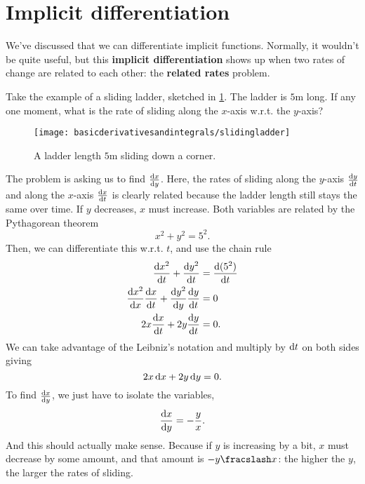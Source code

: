 \section{Implicit differentiation}

We've discussed that we can differentiate implicit functions. Normally, it wouldn't be quite useful, but this \textbf{implicit differentiation} shows up when two rates of change are related to each other: the \textbf{related rates} problem.

Take the example of a sliding ladder, sketched in \cref{fig:slidingladder}. The ladder is $5\unit{\meter}$ long. If any one moment, what is the rate of sliding along the $x$-axis w.r.t. the $y$-axis?

\begin{figure}
    \centering
    \texttt{[image: basicderivativesandintegrals/slidingladder]}
    \caption{A ladder length $5\unit{\meter}$ sliding down a corner.}
    \label{fig:slidingladder}
\end{figure}

The problem is asking us to find $\odv{x}{y}$. Here, the rates of sliding along the $y$-axis $\odv{y}{t}$ and along the $x$-axis $\odv{x}{t}$ is clearly related because the ladder length still stays the same over time. If $y$ decreases, $x$ must increase. Both variables are related by the Pythagorean theorem
\begin{equation}
    x^2 + y^2 = 5^2.
\end{equation}
Then, we can differentiate this w.r.t. $t$, and use the chain rule
\begin{align*}
    \odv{x^2}{t} + \odv{y^2}{t} &= \odv{(5^2)}{t} \\
    \odv{x^2}{x}\odv{x}{t} + \odv{y^2}{y}\odv{y}{t} &= 0 \\
    2x\odv{x}{t} + 2y\odv{y}{t} &= 0.
\end{align*}
We can take advantage of the Leibniz's notation and multiply by $\odif{t}$ on both sides giving
\begin{equation*}
    2x\odif{x} + 2y\odif{y} = 0.
\end{equation*}
To find $\odv{x}{y}$, we just have to isolate the variables,
\begin{align*}
    \odv{x}{y} = -\frac{y}{x}.
\end{align*}
And this should actually make sense. Because if $y$ is increasing by a bit, $x$ must decrease by some amount, and that amount is $-\flatfrac{y}{x}$: the higher the $y$, the larger the rates of sliding.

